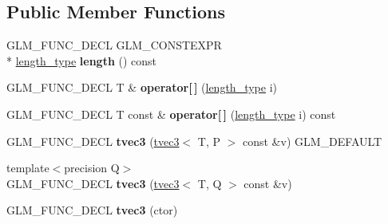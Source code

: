 \subsection*{Public Member Functions}
\begin{DoxyCompactItemize}
\item 
\hypertarget{structglm_1_1tvec3_a81f2c714937ac337c14a60c34c117e9a}{G\-L\-M\-\_\-\-F\-U\-N\-C\-\_\-\-D\-E\-C\-L G\-L\-M\-\_\-\-C\-O\-N\-S\-T\-E\-X\-P\-R \\*
\hyperlink{structglm_1_1tvec3_a3a79c6a1cfc9fb8821a0a878fa2de91a}{length\-\_\-type} {\bfseries length} () const }\label{structglm_1_1tvec3_a81f2c714937ac337c14a60c34c117e9a}

\item 
\hypertarget{structglm_1_1tvec3_ae58fbe8fe435bdd4c928aa08442e7284}{G\-L\-M\-\_\-\-F\-U\-N\-C\-\_\-\-D\-E\-C\-L T \& {\bfseries operator\mbox{[}$\,$\mbox{]}} (\hyperlink{structglm_1_1tvec3_a3a79c6a1cfc9fb8821a0a878fa2de91a}{length\-\_\-type} i)}\label{structglm_1_1tvec3_ae58fbe8fe435bdd4c928aa08442e7284}

\item 
\hypertarget{structglm_1_1tvec3_ae95f5d26f0b9943037ebc580e4b60b7a}{G\-L\-M\-\_\-\-F\-U\-N\-C\-\_\-\-D\-E\-C\-L T const \& {\bfseries operator\mbox{[}$\,$\mbox{]}} (\hyperlink{structglm_1_1tvec3_a3a79c6a1cfc9fb8821a0a878fa2de91a}{length\-\_\-type} i) const }\label{structglm_1_1tvec3_ae95f5d26f0b9943037ebc580e4b60b7a}

\item 
\hypertarget{structglm_1_1tvec3_a34522867a4adb22ac0b33ae6bb24c534}{G\-L\-M\-\_\-\-F\-U\-N\-C\-\_\-\-D\-E\-C\-L {\bfseries tvec3} (\hyperlink{structglm_1_1tvec3}{tvec3}$<$ T, P $>$ const \&v) G\-L\-M\-\_\-\-D\-E\-F\-A\-U\-L\-T}\label{structglm_1_1tvec3_a34522867a4adb22ac0b33ae6bb24c534}

\item 
\hypertarget{structglm_1_1tvec3_aefd460bd84e63834a84908b9271bc5fb}{{\footnotesize template$<$precision Q$>$ }\\G\-L\-M\-\_\-\-F\-U\-N\-C\-\_\-\-D\-E\-C\-L {\bfseries tvec3} (\hyperlink{structglm_1_1tvec3}{tvec3}$<$ T, Q $>$ const \&v)}\label{structglm_1_1tvec3_aefd460bd84e63834a84908b9271bc5fb}

\item 
\hypertarget{structglm_1_1tvec3_ac5602939e9bcc6ec8301df54e7e39ea7}{G\-L\-M\-\_\-\-F\-U\-N\-C\-\_\-\-D\-E\-C\-L {\bfseries tvec3} (ctor)}\label{structglm_1_1tvec3_ac5602939e9bcc6ec8301df54e7e39ea7}


\end{DoxyCompactItemize}
